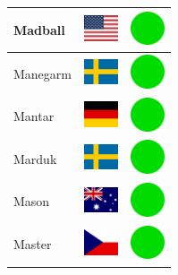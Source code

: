 \documentclass[12pt, a4paper, twoside]{report}
\begin{document}
\begin{center}
\begin{longtable}{|p{5cm}|p{2cm}|p{2cm}|}
Madball & \includegraphics[width=1cm]{4x3/us} & \includegraphics[width=1cm]{likes/y} \\ \hline
Manegarm & \includegraphics[width=1cm]{4x3/se} & \includegraphics[width=1cm]{likes/y} \\ \hline
Mantar & \includegraphics[width=1cm]{4x3/de} & \includegraphics[width=1cm]{likes/y} \\ \hline
Marduk & \includegraphics[width=1cm]{4x3/se} & \includegraphics[width=1cm]{likes/y} \\ \hline
Mason & \includegraphics[width=1cm]{4x3/au} & \includegraphics[width=1cm]{likes/y} \\ \hline
Master & \includegraphics[width=1cm]{4x3/cz} & \includegraphics[width=1cm]{likes/y} \\ \hline

\end{longtable}
\end{center}
\end{document}
